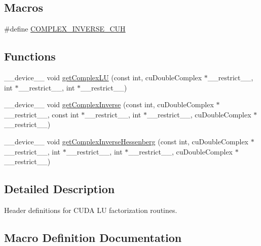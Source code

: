 \subsection*{Macros}
\begin{DoxyCompactItemize}
\item 
\#define \hyperlink{complexInverse_8cuh_a31ab82ad484c489345092056a631004d}{C\+O\+M\+P\+L\+E\+X\+\_\+\+I\+N\+V\+E\+R\+S\+E\+\_\+\+C\+UH}
\end{DoxyCompactItemize}
\subsection*{Functions}
\begin{DoxyCompactItemize}
\item 
\+\_\+\+\_\+device\+\_\+\+\_\+ void \hyperlink{complexInverse_8cuh_a0ad068d6b29da927683f996d74322528}{get\+Complex\+LU} (const int, cu\+Double\+Complex $\ast$\+\_\+\+\_\+restrict\+\_\+\+\_\+, int $\ast$\+\_\+\+\_\+restrict\+\_\+\+\_\+, int $\ast$\+\_\+\+\_\+restrict\+\_\+\+\_\+)
\item 
\+\_\+\+\_\+device\+\_\+\+\_\+ void \hyperlink{complexInverse_8cuh_ac15ce39b4ae91d5178d04a8f6318714a}{get\+Complex\+Inverse} (const int, cu\+Double\+Complex $\ast$\+\_\+\+\_\+restrict\+\_\+\+\_\+, const int $\ast$\+\_\+\+\_\+restrict\+\_\+\+\_\+, int $\ast$\+\_\+\+\_\+restrict\+\_\+\+\_\+, cu\+Double\+Complex $\ast$\+\_\+\+\_\+restrict\+\_\+\+\_\+)
\item 
\+\_\+\+\_\+device\+\_\+\+\_\+ void \hyperlink{complexInverse_8cuh_aaa0897f23eb6101fb0fe703ddbd93b56}{get\+Complex\+Inverse\+Hessenberg} (const int, cu\+Double\+Complex $\ast$\+\_\+\+\_\+restrict\+\_\+\+\_\+, int $\ast$\+\_\+\+\_\+restrict\+\_\+\+\_\+, int $\ast$\+\_\+\+\_\+restrict\+\_\+\+\_\+, cu\+Double\+Complex $\ast$\+\_\+\+\_\+restrict\+\_\+\+\_\+)
\end{DoxyCompactItemize}


\subsection{Detailed Description}
Header definitions for C\+U\+DA LU factorization routines. 



\subsection{Macro Definition Documentation}

